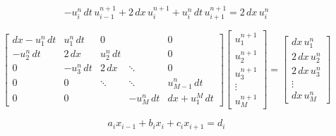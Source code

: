 \begin{equation}
 -u_{i}^{n} \, dt \, u_{i-1}^{n+1} +  2 \, dx \,  u_{i}^{n+1} + u_{i}^{n} \, dt \, u_{i+1}^{n+1}=  2 \, dx \, u_{i}^{n}
\end{equation}



\begin{equation}
\left[{\begin{matrix}
{dx- u_{1}^{n}\, dt}&{ u_{1}^{n} \, dt}&{0}&{}&{0}\\[5pt]
{-u_{2}^{n} \, dt}&{ 2 \, dx}&{ u_{2}^{n} \, dt}&{}&{0}\\[5pt]
{0}&{-u_{3}^{n} \, dt}&{ 2 \, dx}&\ddots &{0}\\[5pt]
{0}&{0}&\ddots &\ddots &{ u_{M-1}^{n} \, dt}\\[5pt]
{0}&{0}&{}&{-u_{M}^{n} \, dt}&{dx + u_{1}^{M}\, dt}
\end{matrix}}
\right]\left[{\begin{matrix}
{ u_{1}^{n+1}}\\[5pt]
{ u_{2}^{n+1}}\\[5pt]
{ u_{3}^{n+1}}\\[5pt]
\vdots \\[5pt]
{ u_{M}^{n+1}}
\end{matrix}}\right]
=\left[{\begin{matrix}
{dx \, u_{1}^{n}}\\[5pt]
{ 2 \, dx \, u_{2}^{n}}\\[5pt]
{ 2 \, dx \, u_{3}^{n}}\\[5pt]
\vdots \\[5pt]
{dx \, u_{M}^{n}}
\end{matrix}}\right]
  \end{equation}

  \begin{equation}
    a_{i}x_{{i-1}}+b_{i}x_{i}+c_{i}x_{{i+1}}=d_{i}
  \end{equation}


